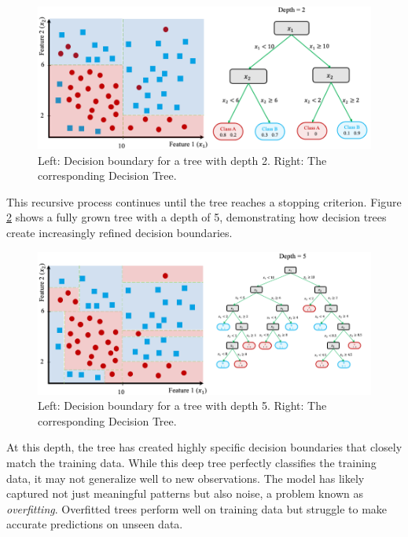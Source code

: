 \documentclass[
]{book}
\theoremstyle{definition}
\theoremstyle{definition}
\theoremstyle{definition}
\theoremstyle{definition}
\theoremstyle{remark}
\begin{document}
\begin{figure}

{\centering \includegraphics[width=1\linewidth]{images/ex_tree_3} 

}

\caption{Left: Decision boundary for a tree with depth 2. Right: The corresponding Decision Tree.}\label{fig:tree-3}
\end{figure}

This recursive process continues until the tree reaches a stopping criterion. Figure \ref{fig:tree-4} shows a fully grown tree with a depth of 5, demonstrating how decision trees create increasingly refined decision boundaries.

\begin{figure}

{\centering \includegraphics[width=1\linewidth]{images/ex_tree_4} 

}

\caption{Left: Decision boundary for a tree with depth 5. Right: The corresponding Decision Tree.}\label{fig:tree-4}
\end{figure}

At this depth, the tree has created highly specific decision boundaries that closely match the training data. While this deep tree perfectly classifies the training data, it may not generalize well to new observations. The model has likely captured not just meaningful patterns but also noise, a problem known as \emph{overfitting}. Overfitted trees perform well on training data but struggle to make accurate predictions on unseen data.
\end{document}
